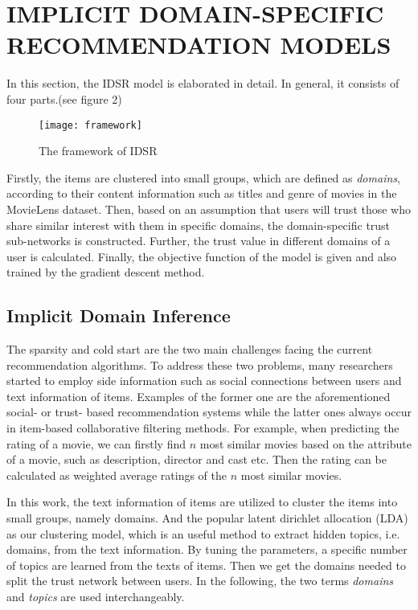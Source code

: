 \section{IMPLICIT DOMAIN-SPECIFIC RECOMMENDATION MODELS}
In this section, the IDSR model is elaborated in detail. In general, it consists of four parts.(see figure 2)
\begin{figure}[h]
	\caption{The framework of IDSR}
	\centering
	\texttt{[image: framework]}
\end{figure}
Firstly, the items are clustered into small groups, which are defined as \emph{domains}, according to their content information such as titles and genre of movies in the MovieLens dataset. Then, based on an assumption that users will trust those who share similar interest with them in specific domains, the domain-specific trust sub-networks is constructed. Further, the trust value in different domains of a user is calculated. Finally, the objective function of the model is given and also trained by the gradient descent method.
\subsection{Implicit Domain Inference}
The sparsity and cold start are the two main challenges facing the current recommendation algorithms. To address these two problems, many researchers started to employ side information such as social connections between users and text information of items. Examples of the former one are the aforementioned social- or trust- based recommendation systems while the latter ones always occur in item-based collaborative filtering methods. For example, when predicting the rating of a movie, we can firstly find $n$ most similar movies based on the attribute of a movie, such as description, director and cast etc. Then the rating can be calculated as weighted average ratings of the $n$ most similar movies.

In this work, the text information of items are utilized to cluster the items into small groups, namely domains. And the popular latent dirichlet allocation (LDA)\cite{blei2003latent} as our clustering model, which is an useful method to extract hidden topics, i.e. domains, from the text information. By tuning the parameters, a specific number of topics are learned from the texts of items. Then we get the domains needed to split the trust network between users. In the following, the two terms \textit{domains} and \textit{topics} are used interchangeably.

